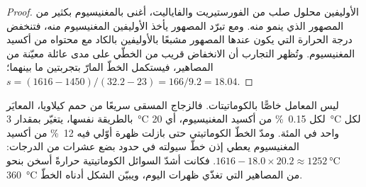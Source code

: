 \begin{proof}
الأوليفين محلول صلب من الفورستيريت والفاياليت، أغنى بالمغنيسيوم بكثير من المصهور
الذي ينمو منه. ومع تبرّد المصهور يأخذ الأوليفين المغنيسيوم منه، فتنخفض درجة الحرارة التي
يكون عندها المصهور مشبعًا بالأوليفين بالكاد مع محتواه من أكسيد المغنيسيوم. وتُظهر التجارب أن
الانخفاض قريب من الخطّي على مدى عائلة معيّنة من المصاهير، فيستكمل الخطّ المارّ
بتجربتين ما بينهما؛ $s = (1616 - 1450)/(32.2 - 23) = 166/9.2 = 18.04$.
\end{proof}

ليس المعامل خاصًّا بالكوماتيتات. فالزجاج المسقى سريعًا من حمم كيلاويا،
المعايَر بالطريقة نفسها، يتغيّر بمقدار \qty{3}{\celsius} لكل \qty{0.15}{\percent} من أكسيد المغنيسيوم، أي
\qty{20}{\celsius} لكل واحد في المئة. ومدّ الخطّ الكوماتيتي حتى بازلت ظهرة أوّلي
فيه \qty{12}{\percent} من أكسيد المغنيسيوم يعطي إذن خطّ سيولته في حدود بضع عشرات من الدرجات: $1616 -
18.0\times20.2 \approx \qty{1252}{\celsius}$. فكانت أشدّ السوائل الكوماتيتية حرارةً
أسخن بنحو \qty{360}{\celsius} من المصاهير التي تغذّي ظهرات اليوم، ويبيّن الشكل أدناه
الخطّ.

